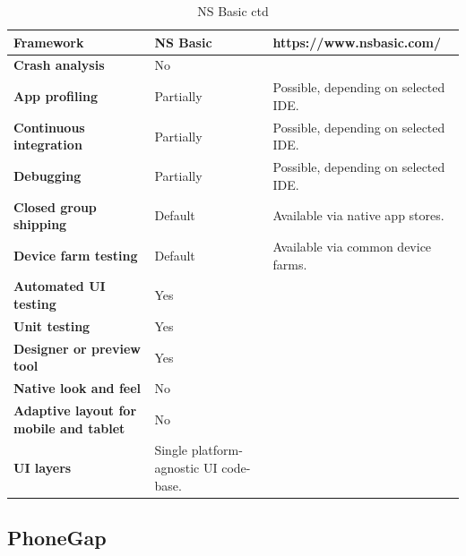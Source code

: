 \documentclass[english,master,public,dept460,male,cpdeclaration,oneside]{diploma}
\begin{document}
\begin{table}[!h]
	\centering
	\caption{NS Basic ctd}
	\begin{tabular}{p{} | p{} | p{}}
		\toprule		
		\textbf{Framework} & \textbf{NS Basic} & https://www.nsbasic.com/ \\
		\midrule
		\textbf{Crash analysis} & No & \\			
		\midrule
		\textbf{App profiling} & Partially & Possible, depending on selected IDE. \\			
		\midrule
		\textbf{Continuous integration} & Partially & Possible, depending on selected IDE. \\			
		\midrule
		\textbf{Debugging} & Partially & Possible, depending on selected IDE. \\			
		\midrule
		\textbf{Closed group shipping} & Default & Available via native app stores. \\			
		\midrule
		\textbf{Device farm testing} & Default & Available via common device farms. \\			
		\midrule
		\textbf{Automated UI testing} & Yes & \\			
		\midrule
		\textbf{Unit testing} & Yes & \\			
		\midrule
		\textbf{Designer or preview tool} & Yes & \\			
		\midrule
		\textbf{Native look and feel} & No & \\			
		\midrule
		\textbf{Adaptive layout for mobile and tablet} & No & \\			
		\midrule		
		\textbf{UI layers} & Single platform-agnostic UI code-base. & \\			
		\midrule
	\end{tabular}
\end{table}

\clearpage
\subsection{PhoneGap}
\end{document}
